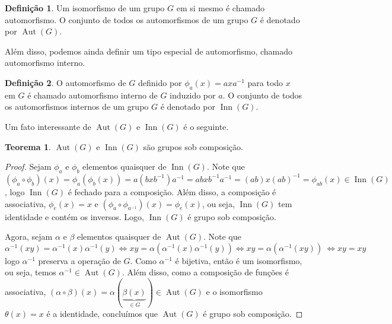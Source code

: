 \documentclass[a4paper,portuguese,11pt,twoside, leqno]{book}
\DeclareMathOperator{\aut}{Aut}
\DeclareMathOperator{\inn}{Inn}
\theoremstyle{definition}
\newtheorem{theorem}{Teorema}[section]
\newtheorem{deff}{Definição}[section]
\begin{document}
	\begin{deff}
		\label{def automorfismo}
		Um isomorfismo de um grupo $G$ em si mesmo é chamado automorfismo. O conjunto de todos os automorfismos de um grupo $G$ é denotado por $\aut(G)$.
	\end{deff}
	\par\vspace{0.3cm} Além disso, podemos ainda definir um tipo especial de automorfismo, chamado automorfismo interno.
	\begin{deff}
		\label{def automorfismo interno}
		O automorfismo de $G$ definido por $\phi_a(x) = axa^{-1}$ para todo $x$ em $G$ é chamado automorfismo interno de $G$ induzido por $a$. O conjunto de todos os automorfismos internos de um grupo $G$ é denotado por $\inn(G)$.
	\end{deff}
	\par\vspace{0.3cm} Um fato interessante de $\aut(G)$ e $\inn(G)$ é o seguinte.
	\begin{theorem}
		$\aut(G)$ e $\inn(G)$ são grupos sob composição.
	\end{theorem}
	\begin{proof}
		\vspace{0.3cm}\par Sejam $\phi_a$ e $\phi_b$ elementos quaisquer de $\inn(G)$. Note que $(\phi_a\circ\phi_b)(x) = \phi_a(\phi_b(x)) = a(bxb^{-1})a^{-1} = abxb^{-1}a^{-1} = (ab)x(ab)^{-1} = \phi_{ab}(x) \in \inn(G)$, logo $\inn(G)$ é fechado para a composição. Além disso, a composição é associativa, $\phi_e(x) = x$ e $(\phi_a\circ\phi_{a^{-1}})(x) = \phi_e(x)$, ou seja, $\inn(G)$ tem identidade e contém os inversos. Logo, $\inn(G)$ é grupo sob composição.
		
		\vspace{0.3cm}\par Agora, sejam $\alpha$ e $\beta$ elementos quaisquer de $\aut(G)$. Note que 
		\begin{equation*}
		\alpha^{-1}(xy) = \alpha^{-1}(x)\alpha^{-1}(y) \Leftrightarrow xy = \alpha(\alpha^{-1}(x)\alpha^{-1}(y)) \Leftrightarrow xy = \alpha(\alpha^{-1}(xy))\ \Leftrightarrow xy = xy
		\end{equation*}
		logo $\alpha^{-1}$ preserva a operação de $G$. Como $\alpha^{-1}$ é bijetiva, então é um isomorfismo, ou seja, temos $\alpha^{-1}\in \aut(G)$. Além disso, como a composição de funções é associativa, $(\alpha\circ\beta)(x) = \alpha(\underbrace{\beta(x)}_{\in G}) \in \aut(G)$ e o isomorfismo $\theta(x) = x$ é a identidade, concluímos que $\aut(G)$ é grupo sob composição.\end{proof}
\end{document}
